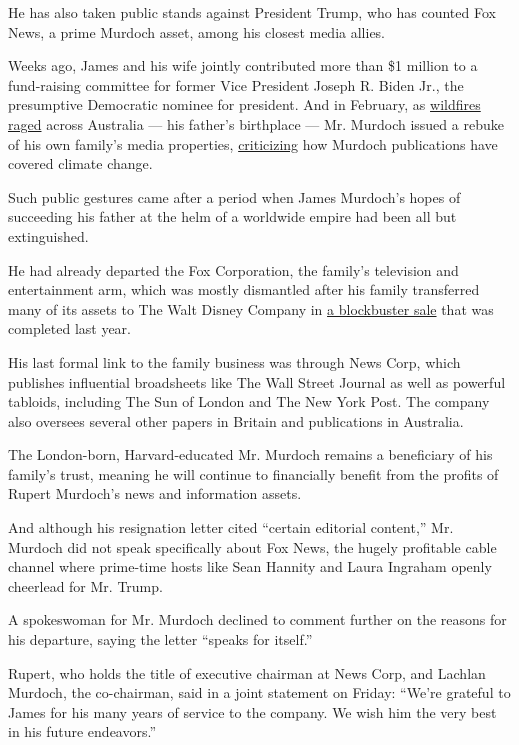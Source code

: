 He has also taken public stands against President Trump, who has counted
Fox News, a prime Murdoch asset, among his closest media allies.

Weeks ago, James and his wife jointly contributed more than \$1 million
to a fund-raising committee for former Vice President Joseph R. Biden
Jr., the presumptive Democratic nominee for president. And in February,
as
\href{https://www.nytimes3xbfgragh.onion/2020/01/21/world/australia/fires-size-climate.html}{wildfires
raged} across Australia --- his father's birthplace --- Mr. Murdoch
issued a rebuke of his own family's media properties,
\href{https://www.nytimes3xbfgragh.onion/2020/02/12/business/dealbook/james-murdoch-environment.html}{criticizing}
how Murdoch publications have covered climate change.

Such public gestures came after a period when James Murdoch's hopes of
succeeding his father at the helm of a worldwide empire had been all but
extinguished.

He had already departed the Fox Corporation, the family's television and
entertainment arm, which was mostly dismantled after his family
transferred many of its assets to The Walt Disney Company in
\href{https://www.nytimes3xbfgragh.onion/2018/07/27/business/media/disney-fox-merger-vote.html}{a
blockbuster sale} that was completed last year.

His last formal link to the family business was through News Corp, which
publishes influential broadsheets like The Wall Street Journal as well
as powerful tabloids, including The Sun of London and The New York Post.
The company also oversees several other papers in Britain and
publications in Australia.

The London-born, Harvard-educated Mr. Murdoch remains a beneficiary of
his family's trust, meaning he will continue to financially benefit from
the profits of Rupert Murdoch's news and information assets.

And although his resignation letter cited ``certain editorial content,''
Mr. Murdoch did not speak specifically about Fox News, the hugely
profitable cable channel where prime-time hosts like Sean Hannity and
Laura Ingraham openly cheerlead for Mr. Trump.

A spokeswoman for Mr. Murdoch declined to comment further on the reasons
for his departure, saying the letter ``speaks for itself.''

Rupert, who holds the title of executive chairman at News Corp, and
Lachlan Murdoch, the co-chairman, said in a joint statement on Friday:
``We're grateful to James for his many years of service to the company.
We wish him the very best in his future endeavors.''

